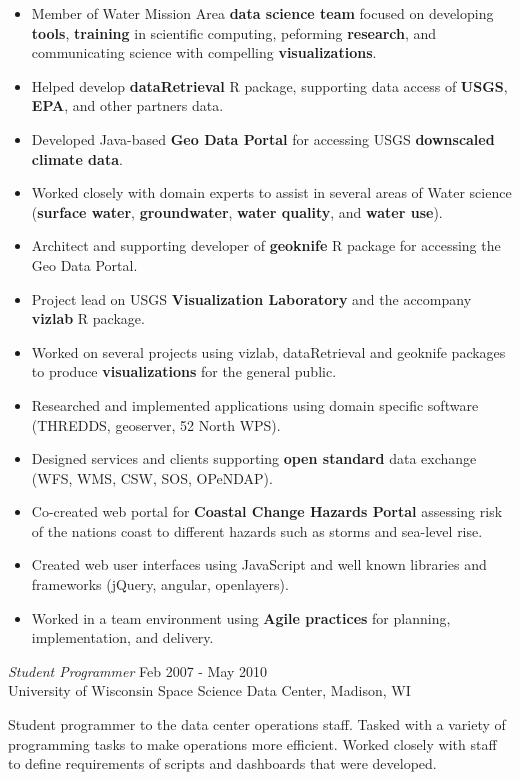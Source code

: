 \documentclass[line,margin]{res}
\begin{document}
\begin{resume}
	     \begin{itemize} \itemsep -2pt %
		\item Member of Water Mission Area \textbf{data science team} focused on developing \textbf{tools}, \textbf{training} in scientific computing, peforming \textbf{research}, and communicating science with compelling \textbf{visualizations}.
		\item Helped develop \textbf{dataRetrieval} R package, supporting data access of \textbf{USGS}, \textbf{EPA}, and other partners data.
		\item Developed Java-based \textbf{Geo Data Portal} for accessing USGS \textbf{downscaled climate data}.
		\item Worked closely with domain experts to assist in several areas of Water science (\textbf{surface water}, \textbf{groundwater}, \textbf{water quality}, and \textbf{water use}).
		\item Architect and supporting developer of \textbf{geoknife} R package for accessing the Geo Data Portal.
		\item Project lead on USGS \textbf{Visualization Laboratory} and the accompany \textbf{vizlab} R package.
		\item Worked on several projects using vizlab, dataRetrieval and geoknife packages to produce \textbf{visualizations} for the general public.
		\item Researched and implemented applications using domain specific software (THREDDS, geoserver, 52 North WPS).
		\item Designed services and clients supporting \textbf{open standard} data exchange (WFS, WMS, CSW, SOS, OPeNDAP).
		\item Co-created web portal for \textbf{Coastal Change Hazards Portal} assessing risk of the nations coast to different hazards such as storms and sea-level rise.
		\item Created web user interfaces using JavaScript and well known libraries and frameworks (jQuery, angular, openlayers).
		\item Worked in a team environment using \textbf{Agile practices} for planning, implementation, and delivery.
	     \end{itemize}
		{\sl Student Programmer} \hfill Feb 2007 - May 2010 \\
		University of Wisconsin Space Science Data Center, Madison, WI
                
		Student programmer to the data center operations staff.  Tasked with a variety of programming tasks to make operations more efficient.  Worked closely with staff to define requirements of scripts and dashboards that were developed.


\end{resume}
\end{document}
